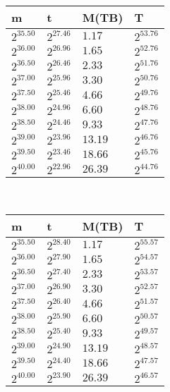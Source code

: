 \begin{tabular}{llll}
m & t & M(TB) & T \\ \hline
$2^{35.50}$ & $2^{27.46}$ & $1.17$ & $2^{53.76}$ \\
$2^{36.00}$ & $2^{26.96}$ & $1.65$ & $2^{52.76}$ \\
$2^{36.50}$ & $2^{26.46}$ & $2.33$ & $2^{51.76}$ \\
$2^{37.00}$ & $2^{25.96}$ & $3.30$ & $2^{50.76}$ \\
$2^{37.50}$ & $2^{25.46}$ & $4.66$ & $2^{49.76}$ \\
$2^{38.00}$ & $2^{24.96}$ & $6.60$ & $2^{48.76}$ \\
$2^{38.50}$ & $2^{24.46}$ & $9.33$ & $2^{47.76}$ \\
$2^{39.00}$ & $2^{23.96}$ & $13.19$ & $2^{46.76}$ \\
$2^{39.50}$ & $2^{23.46}$ & $18.66$ & $2^{45.76}$ \\
$2^{40.00}$ & $2^{22.96}$ & $26.39$ & $2^{44.76}$ \\
\end{tabular}
 \ 
\begin{tabular}{llll}
m & t & M(TB) & T \\ \hline
$2^{35.50}$ & $2^{28.40}$ & $1.17$ & $2^{55.57}$ \\
$2^{36.00}$ & $2^{27.90}$ & $1.65$ & $2^{54.57}$ \\
$2^{36.50}$ & $2^{27.40}$ & $2.33$ & $2^{53.57}$ \\
$2^{37.00}$ & $2^{26.90}$ & $3.30$ & $2^{52.57}$ \\
$2^{37.50}$ & $2^{26.40}$ & $4.66$ & $2^{51.57}$ \\
$2^{38.00}$ & $2^{25.90}$ & $6.60$ & $2^{50.57}$ \\
$2^{38.50}$ & $2^{25.40}$ & $9.33$ & $2^{49.57}$ \\
$2^{39.00}$ & $2^{24.90}$ & $13.19$ & $2^{48.57}$ \\
$2^{39.50}$ & $2^{24.40}$ & $18.66$ & $2^{47.57}$ \\
$2^{40.00}$ & $2^{23.90}$ & $26.39$ & $2^{46.57}$ \\
\end{tabular}